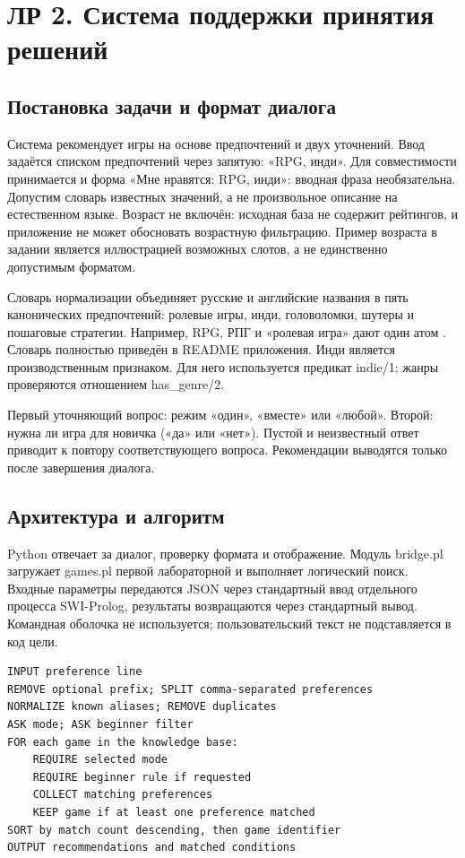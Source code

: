 \section{ЛР 2. Система поддержки принятия решений}
\subsection{Постановка задачи и формат диалога}
Система рекомендует игры на основе предпочтений и двух уточнений.
Ввод задаётся списком предпочтений через запятую: «RPG, инди».
Для совместимости принимается и форма «Мне нравятся: RPG, инди»:
вводная фраза необязательна. Допустим словарь известных значений,
а не произвольное описание на естественном языке.
Возраст не включён: исходная база не содержит рейтингов, и приложение
не может обосновать возрастную фильтрацию. Пример возраста в задании
является иллюстрацией возможных слотов, а не единственно допустимым форматом.

Словарь нормализации объединяет русские и английские названия в пять
канонических предпочтений: ролевые игры, инди, головоломки, шутеры и
пошаговые стратегии. Например, RPG, РПГ и «ролевая игра» дают один атом
. Словарь полностью приведён в README приложения.
Инди является производственным признаком.
Для него используется предикат indie/1; жанры проверяются отношением has\_genre/2.

Первый уточняющий вопрос: режим «один», «вместе» или «любой».
Второй: нужна ли игра для новичка («да» или «нет»).
Пустой и неизвестный ответ приводит к повтору соответствующего вопроса.
Рекомендации выводятся только после завершения диалога.

\subsection{Архитектура и алгоритм}
Python отвечает за диалог, проверку формата и отображение.
Модуль bridge.pl загружает games.pl первой лабораторной и выполняет логический
поиск. Входные параметры передаются JSON через стандартный ввод отдельного
процесса SWI-Prolog, результаты возвращаются через стандартный вывод.
Командная оболочка не используется; пользовательский текст не подставляется в код цели.

\begin{lstlisting}
INPUT preference line
REMOVE optional prefix; SPLIT comma-separated preferences
NORMALIZE known aliases; REMOVE duplicates
ASK mode; ASK beginner filter
FOR each game in the knowledge base:
    REQUIRE selected mode
    REQUIRE beginner rule if requested
    COLLECT matching preferences
    KEEP game if at least one preference matched
SORT by match count descending, then game identifier
OUTPUT recommendations and matched conditions
\end{lstlisting}

